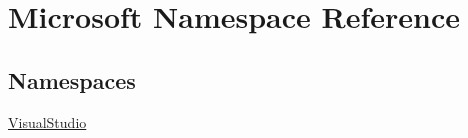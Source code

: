\hypertarget{namespace_microsoft}{}\section{Microsoft Namespace Reference}
\label{namespace_microsoft}
\subsection*{Namespaces}
\begin{DoxyCompactItemize}
\item 
 \hyperlink{namespace_microsoft_1_1_visual_studio}{Visual\+Studio}
\end{DoxyCompactItemize}
